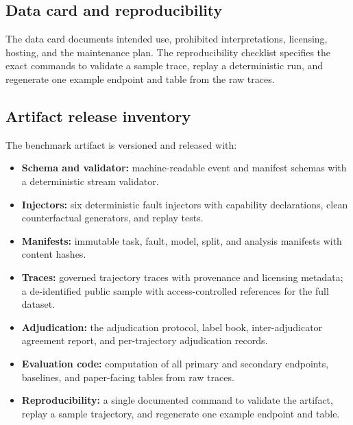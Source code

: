 \subsection{Data card and reproducibility}

The data card documents intended use, prohibited interpretations, licensing,
hosting, and the maintenance plan. The reproducibility checklist specifies
the exact commands to validate a sample trace, replay a deterministic run,
and regenerate one example endpoint and table from the raw traces.

\subsection{Artifact release inventory}

The benchmark artifact is versioned and released with:

\begin{itemize}
    \item \textbf{Schema and validator:} machine-readable event and manifest
          schemas with a deterministic stream validator.
    \item \textbf{Injectors:} six deterministic fault injectors with
          capability declarations, clean counterfactual generators, and
          replay tests.
    \item \textbf{Manifests:} immutable task, fault, model, split, and
          analysis manifests with content hashes.
    \item \textbf{Traces:} governed trajectory traces with provenance and
          licensing metadata; a de-identified public sample with
          access-controlled references for the full dataset.
    \item \textbf{Adjudication:} the adjudication protocol, label book,
          inter-adjudicator agreement report, and per-trajectory
          adjudication records.
    \item \textbf{Evaluation code:} computation of all primary and secondary
          endpoints, baselines, and paper-facing tables from raw traces.
    \item \textbf{Reproducibility:} a single documented command to validate
          the artifact, replay a sample trajectory, and regenerate one
          example endpoint and table.
\end{itemize}
